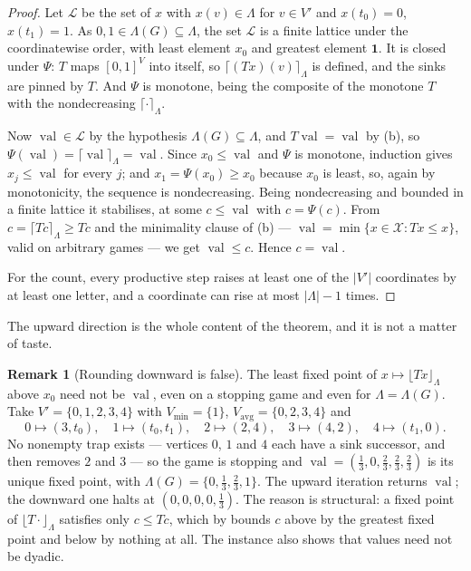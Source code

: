 \documentclass[11pt]{article}
\theoremstyle{plain}
\theoremstyle{definition}
\newtheorem{remark}[theorem]{Remark}
\DeclareMathOperator{\val}{val}
\newcommand{\Vmin}{V_{\min}}
\newcommand{\Vavg}{V_{\mathrm{avg}}}
\newcommand{\bbone}{\mathbf{1}}
\begin{document}
\begin{proof}
Let $\mathcal L$ be the set of $x$ with $x(v)\in\Lambda$ for $v\in V'$ and
$x(t_0)=0$, $x(t_1)=1$. As $0,1\in\Lambda(G)\subseteq\Lambda$, the set
$\mathcal L$ is a finite lattice under the coordinatewise order, with least
element $x_0$ and greatest element $\bbone$. It is closed under $\Psi$:
$T$ maps $[0,1]^{V}$ into itself, so $\lceil (Tx)(v)\rceil_\Lambda$ is
defined, and the sinks are pinned by $T$. And $\Psi$ is monotone, being
the composite of the monotone $T$ with the nondecreasing
$\lceil\cdot\rceil_\Lambda$.

Now $\val\in\mathcal L$ by the hypothesis $\Lambda(G)\subseteq\Lambda$, and
$T\val=\val$ by (b), so
$\Psi(\val)=\lceil\val\rceil_\Lambda=\val$. Since $x_0\le\val$ and $\Psi$
is monotone, induction gives $x_j\le\val$ for every $j$; and
$x_1=\Psi(x_0)\ge x_0$ because $x_0$ is least, so, again by monotonicity,
the sequence is nondecreasing. Being nondecreasing and bounded in a finite
lattice it stabilises, at some $c\le\val$ with $c=\Psi(c)$. From
$c=\lceil Tc\rceil_\Lambda\ge Tc$ and the minimality clause of
(b) --- $\val=\min\{x\in\mathcal X:Tx\le x\}$, valid
on arbitrary games --- we get $\val\le c$. Hence $c=\val$.

For the count, every productive step raises at least one of the $|V'|$
coordinates by at least one letter, and a coordinate can rise at most
$|\Lambda|-1$ times.
\end{proof}

The upward direction is the whole content of the theorem, and it is not a
matter of taste.

\begin{remark}[Rounding downward is false]\label{rem:alphabet-down}
The least fixed point of $x\mapsto\lfloor Tx\rfloor_\Lambda$ above $x_0$
need not be $\val$, even on a stopping game and even for
$\Lambda=\Lambda(G)$. Take $V'=\{0,1,2,3,4\}$ with
$\Vmin=\{1\}$, $\Vavg=\{0,2,3,4\}$ and
\[
  0\mapsto(3,t_0),\quad 1\mapsto(t_0,t_1),\quad 2\mapsto(2,4),\quad
  3\mapsto(4,2),\quad 4\mapsto(t_1,0).
\]
No nonempty trap exists --- vertices $0$, $1$ and $4$ each have a sink
successor, and  then removes $2$ and $3$ --- so the game
is stopping and $\val=(\tfrac13,0,\tfrac23,\tfrac23,\tfrac23)$ is its
unique fixed point, with $\Lambda(G)=\{0,\tfrac13,\tfrac23,1\}$. The upward
iteration returns $\val$; the downward one halts at
$(0,0,0,0,\tfrac13)$. The reason is structural: a fixed point of
$\lfloor T\cdot\rfloor_\Lambda$ satisfies only $c\le Tc$, which by
 bounds $c$ above by the greatest fixed point and
below by nothing at all. The instance also shows that values need not be
dyadic.
\end{remark}
\end{document}
